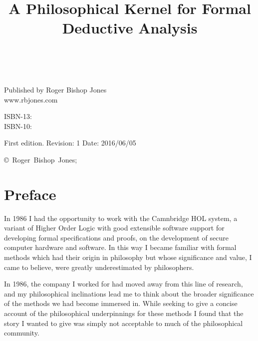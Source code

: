 \documentclass[10pt,titlepage]{book}
\title{A Philosophical Kernel for Formal Deductive Analysis}
\date{\ }
\begin{document}
\frontmatter
                               
\begin{titlepage}
\maketitle

\hspace{2in}

\vfill

\begin{centering}

Published by Roger Bishop Jones\\
www.rbjones.com\\
\vspace{0.2in}

ISBN-13: \\
ISBN-10: 

\vspace{0.2in}

{\footnotesize

First edition. Revision: 1 Date: 2016/06/05

\vspace{0.2in}

\copyright\ Roger~Bishop~Jones;

}%

\end{centering}


\thispagestyle{empty}
\end{titlepage}

\setcounter{tocdepth}{2}
{\parskip-0pt\tableofcontents}
\listoffigures

\mainmatter


\section*{Preface}

In 1986 I had the opportunity to work with the Camnbridge HOL system, a variant of Higher Order Logic with good extensible software support for developing formal specifications and proofs, on the development of secure computer hardware and software.
In this way I became familiar with formal methods which had their origin in philosophy but whose significance and value, I came to believe, were greatly underestimated by philosophers.

In 1986, the company I worked for had moved away from this line of research, and my philosophical inclinations lead me to think about the broader significance of the methods we had become immersed in.
While seeking to give a concise account of the philosophical underpinnings for these methods I found that the story I wanted to give was simply not acceptable to much of the philosophical community.
\end{document}
